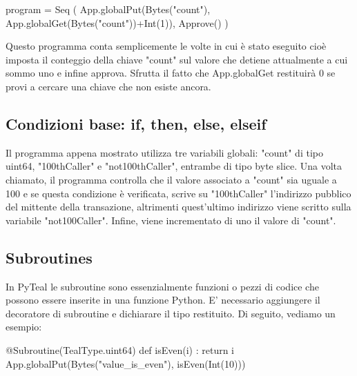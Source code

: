 \begin{pythoncode}
program = Seq (
    App.globalPut(Bytes("count"), App.globalGet(Bytes("count"))+Int(1)),
    Approve()
)
\end{pythoncode}
% 

Questo programma conta semplicemente le volte in cui è stato eseguito cioè imposta il conteggio della chiave "count" sul valore che detiene attualmente a cui sommo uno e infine approva. Sfrutta il fatto che App.globalGet restituirà 0 se provi a cercare una chiave che non esiste ancora.

\subsection{Condizioni base: if, then, else, elseif}

Il programma appena mostrato utilizza tre variabili globali: "count" di tipo uint64, "100thCaller" e "not100thCaller", entrambe di tipo byte slice. Una volta chiamato, il programma controlla che il valore associato a "count" sia uguale a 100 e se questa condizione è verificata, scrive su "100thCaller" l'indirizzo pubblico del mittente della transazione, altrimenti quest'ultimo indirizzo viene scritto sulla variabile "not100Caller". Infine, viene incrementato di uno il valore di "count".

\subsection{Subroutines}
In PyTeal le subroutine sono essenzialmente funzioni o pezzi di codice che possono essere inserite in una funzione Python. E' necessario aggiungere  il decoratore di subroutine e dichiarare il tipo restituito. Di seguito, vediamo un esempio:

\begin{pythoncode}
@Subroutine(TealType.uint64)
def isEven(i) :
    return i%
App.globalPut(Bytes("value_is_even"), isEven(Int(10)))
\end{pythoncode}
% 

